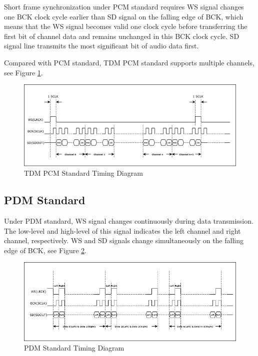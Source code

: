 \documentclass[main\_\_CN.tex]{subfiles}
\begin{document}
Short frame synchronization under PCM standard requires WS signal changes one BCK clock cycle earlier than SD signal on the falling edge of BCK, which means that the WS signal becomes valid one clock cycle before transferring the first bit of channel data and remains unchanged in this BCK clock cycle. SD signal line transmits the most significant bit of audio data first.

Compared with PCM standard, TDM PCM standard supports multiple channels, see Figure  \ref{Figure:i2s_pcm_mode}.

\begin{figure}[H]
    \centering
    \includegraphics[width=1.0\textwidth]{03-I2S/figures/i2s_tdm_pcm_mode.png}
    \caption{TDM PCM Standard Timing Diagram}
    \label{Figure:i2s_pcm_mode}
\end{figure}

\subsection{PDM Standard}
Under PDM standard, WS signal changes continuously during data transmission. The low-level and high-level of this signal indicates the left channel and right channel, respectively. WS and SD signals change simultaneously on the falling edge of BCK, see Figure  \ref{Figure:i2s_pdm_mode}.

\begin{figure}[H]
    \centering
    \includegraphics[width=1.0\textwidth]{03-I2S/figures/i2s_pdm_mode.png}
    \caption{PDM Standard Timing Diagram}
    \label{Figure:i2s_pdm_mode}
\end{figure}
\end{document}
